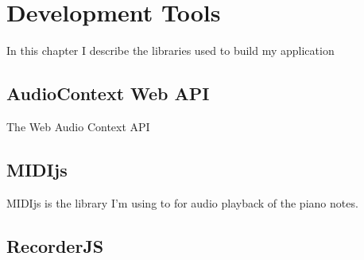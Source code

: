 \chapter{Development Tools}
In this chapter I describe the libraries used to build my application

	\section{AudioContext Web API}
	The Web Audio Context API
	\section{MIDIjs}
	MIDIjs is the library I'm using to for audio playback of the piano notes.
	
	\section{RecorderJS}


